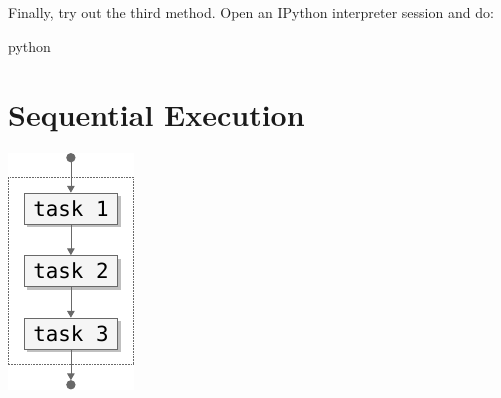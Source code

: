 \documentclass[aspectratio=1610,t]{beamer}
\begin{document}
\begin{pframe}
 Finally, try out the third method. Open an IPython interpreter session and do:
 \begin{ipython}
  \begin{pythonin}{python}
  \end{pythonin}
 \end{ipython}
\end{pframe}


\section{Sequential Execution}

\begin{pframe}
 \begin{center}
   \includegraphics[width=0.25\textwidth]{../../images/flow_sequential.pdf}
 \end{center}
\end{pframe}
\end{document}
